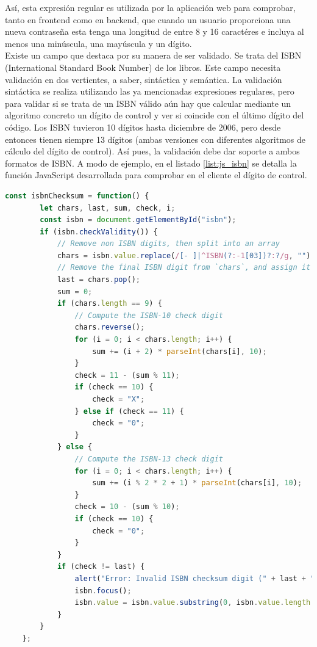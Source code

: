 \documentclass[a4paper]{article}
\begin{document}
    Así, esta expresión regular es utilizada por la aplicación web para comprobar, tanto en frontend como en backend, que cuando un usuario proporciona una nueva contraseña esta tenga una longitud de entre 8 y 16 caractéres e incluya al menos una minúscula, una mayúscula y un dígito.
    \\
    
    Existe un campo que destaca por su manera de ser validado. Se trata del ISBN (International Standard Book Number) de los libros. Este campo necesita validación en dos vertientes, a saber, sintáctica y semántica. La validación sintáctica se realiza utilizando las ya mencionadas expresiones regulares, pero para validar si se trata de un ISBN válido aún hay que calcular mediante un algoritmo concreto un dígito de control y ver si coincide con el último dígito del código. Los ISBN tuvieron 10 dígitos hasta diciembre de 2006, pero desde entonces tienen siempre 13 dígitos (ambas versiones con diferentes algoritmos de cálculo del dígito de control). Así pues, la validación debe dar soporte a ambos formatos de ISBN. A modo de ejemplo, en el listado \ref{list:js_isbn} se detalla la función JavaScript desarrollada para comprobar en el cliente el dígito de control.
    \\
    
    \begin{lstlisting}[language=JavaScript,caption=Validación del dígito de control del ISBN en cliente,label=list:js_isbn]
    const isbnChecksum = function() {
    	let chars, last, sum, check, i;
    	const isbn = document.getElementById("isbn");
    	if (isbn.checkValidity()) {
    		// Remove non ISBN digits, then split into an array
    		chars = isbn.value.replace(/[- ]|^ISBN(?:-1[03])?:?/g, "").split("");
    		// Remove the final ISBN digit from `chars`, and assign it to `last`
    		last = chars.pop();
    		sum = 0;
    		if (chars.length == 9) {
    			// Compute the ISBN-10 check digit
    			chars.reverse();
    			for (i = 0; i < chars.length; i++) {
    				sum += (i + 2) * parseInt(chars[i], 10);
    			}
    			check = 11 - (sum % 11);
    			if (check == 10) {
    				check = "X";
    			} else if (check == 11) {
    				check = "0";
    			}
    		} else {
    			// Compute the ISBN-13 check digit
    			for (i = 0; i < chars.length; i++) {
    				sum += (i % 2 * 2 + 1) * parseInt(chars[i], 10);
    			}
    			check = 10 - (sum % 10);
    			if (check == 10) {
    				check = "0";
    			}
    		}
    		if (check != last) {
    			alert("Error: Invalid ISBN checksum digit (" + last + "). Try with (" + check + ")");
    			isbn.focus();
    			isbn.value = isbn.value.substring(0, isbn.value.length - 1);
    		}
    	}
    };
    \end{lstlisting}
    
\end{document}
